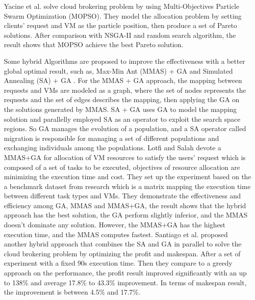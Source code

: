 \documentclass[onecolumn,10pt]{asme2ej}
\begin{document}
Yacine et al. \cite{kessaci2013pareto} solve cloud brokering problem by using Multi-Objectives Particle Swarm Optimization (MOPSO). They model the allocation problem by setting clients’ request and VM as the particle position, then produce a set of Pareto solutions. After comparison with NSGA-II and random search algorithm, the result shows that MOPSO achieve the best Pareto solution.  

Some hybrid Algorithms are proposed to improve the effectiveness with a better global optimal result, such as, Max-Min Ant (MMAS) \cite{stutzle2000max} + GA \cite{hajjem2016mmas} and Simulated Annealing (SA) + GA \cite{iturriaga2013parallel}. For the MMAS + GA approach, the mapping between requests and VMs are modeled as a graph, where the set of nodes represents the requests and the set of edges describes the mapping, then applying the GA on the solutions generated by MMAS. SA + GA uses GA to model the mapping solution and parallelly employed SA as an operator to exploit the search space regions. So GA manages the evolution of a population, and a SA operator called migration is responsible for managing a set of different populations and exchanging individuals among the populations. Lotfi and Salah \cite{hajjem2016mmas} devote a MMAS+GA for allocation of VM resources to satisfy the users’ request which is composed of a set of tasks to be executed, objectives of resource allocation are minimizing the execution time and cost. They set up the experiment based on the a benchmark dataset from research \cite{HCSP} which is a matrix mapping the execution time between different task types and VMs. They demonstrate the effectiveness and efficiency among GA, MMAS and MMAS+GA, the result shows that the hybrid approach has the best solution, the GA perform slightly inferior, and the MMAS doesn’t dominate any solution. However, the MMAS+GA has the highest execution time, and the MMAS computes fastest. Santiago et al. \cite{iturriaga2013parallel} proposed another hybrid approach that combines the SA and GA in parallel to solve the cloud brokering problem by optimizing the profit and makespan. After a set of experiment with a fixed 90s execution time. Then they compare to a greedy approach on the performance, the profit result improved significantly with an up to 138\% and average 17.8\% to 43.3\% improvement. In terms of makespan result, the improvement is between 4.5\% and 17.7\%.
\end{document}
